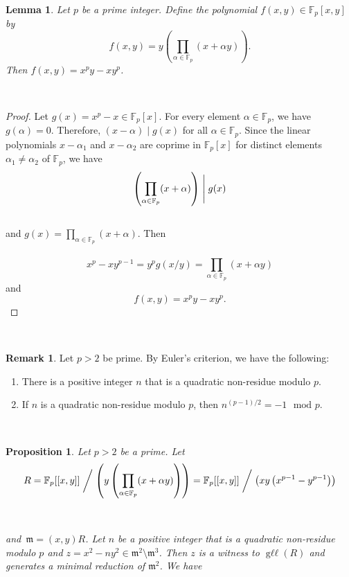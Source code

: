 \documentclass{amsart}
\newtheorem{proposition}[theorem]{Proposition}
\newtheorem{lemma}[theorem]{Lemma}
\theoremstyle{definition}
\theoremstyle{definition}
\newtheorem{remark}[theorem]{Remark}
\numberwithin{equation}{section}
\theoremstyle{definition}
\DeclareMathOperator{\Gll}{g\ell\ell}
\begin{document}
{\begin{lemma}
Let $p$ be a prime integer. Define the polynomial $f(x,y) \in \mathbb{F}_{p}[x,y]$ by 
\[
f(x,y) = y \left(\prod\limits_{\alpha \in \mathbb{F}_p} (x+\alpha y) \right).
\] Then $f(x,y)=x^p y-xy^p$.
\end{lemma}\text{}\\
\begin{proof}
Let $g(x)=x^p-x \in \mathbb{F}_{p}[x]$. For every element $\alpha \in \mathbb{F}_{p}$, we have $g(\alpha)=0$. Therefore, $(x-\alpha) \mid g(x)$ for all $\alpha \in \mathbb{F}_{p}$. Since the linear polynomials $x-\alpha_1$ and $x-\alpha_2$ are coprime in $\mathbb{F}_p[x]$ for distinct elements $\alpha_1 \neq \alpha_2$ of $\mathbb{F}_p$, we have \\
\[
\left(\prod\limits_{\alpha \in \mathbb{F}_p} (x+\alpha ) \right) \Biggm| g(x)  
\] \text{}\\ and $g(x)=\prod\limits_{\alpha \in \mathbb{F}_p} (x+\alpha)$. Then \\\\
\[
x^p-xy^{p-1}=y^pg(x/y)=\prod\limits_{\alpha \in \mathbb{F}_p} (x+\alpha y) 
\] and 
\[
f(x,y)=x^p y- xy^p.
\]
\end{proof}
\text{}\\
\begin{remark}\label{remark:2.11}
Let $p>2$ be prime. By Euler's criterion, we have the following: \\
\begin{enumerate}
\item[(a)] There is a positive integer $n$ that is a quadratic non-residue modulo $p$.\\
\item[(b)] If $n$ is a quadratic non-residue modulo $p$, then $n^{(p-1)/2}=-1 \,\,\,\,\text{mod} \,\,p$.
\end{enumerate}
\end{remark}
\text{}\\
\begin{proposition}\label{proposition:2.13} 
Let $p>2$ be a prime. Let \\
\[
R=\mathbb{F}_{p}[[x,y]] \biggm/ \left(y \left(\prod\limits_{\alpha \in \mathbb{F}_p} (x+\alpha y) \right) \right) = \mathbb{F}_{p}[[x,y]] \biggm/\left(xy \left(x^{p-1} - y^{p-1} \right) \right)
\] \text{}\\\\ and \,$\mathfrak{m}=(x,y)R$. Let $n$ be a positive integer that is a quadratic non-residue modulo $p$ and $z=x^2-ny^2 \in \mathfrak{m}^2 \setminus \mathfrak{m}^3$. Then $z$ is a witness to $\Gll(R)$ and generates a minimal reduction of $\mathfrak{m}^2$. We have \\

\end{proposition}}
\end{document}
